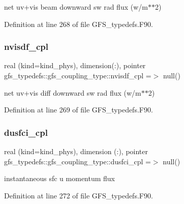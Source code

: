 net uv+vis beam downward sw rad flux (w/m$\ast$$\ast$2) 



Definition at line 268 of file G\+F\+S\+\_\+typedefs.\+F90.

\mbox{\label{structgfs__typedefs_1_1gfs__coupling__type_a486f2ffa99058e4e4cb3ec35f9bd5122}} 
\subsubsection{nvisdf\+\_\+cpl}
{\footnotesize\ttfamily real (kind=kind\+\_\+phys), dimension(\+:), pointer gfs\+\_\+typedefs\+::gfs\+\_\+coupling\+\_\+type\+::nvisdf\+\_\+cpl =$>$ null()}



net uv+vis diff downward sw rad flux (w/m$\ast$$\ast$2) 



Definition at line 269 of file G\+F\+S\+\_\+typedefs.\+F90.

\mbox{\label{structgfs__typedefs_1_1gfs__coupling__type_af62caaab262f6c0cd4082cf2f07096b1}} 
\subsubsection{dusfci\+\_\+cpl}
{\footnotesize\ttfamily real (kind=kind\+\_\+phys), dimension (\+:), pointer gfs\+\_\+typedefs\+::gfs\+\_\+coupling\+\_\+type\+::dusfci\+\_\+cpl =$>$ null()}



instantaneous sfc u momentum flux 



Definition at line 272 of file G\+F\+S\+\_\+typedefs.\+F90.

\mbox{\label{structgfs__typedefs_1_1gfs__coupling__type_a09a262df2d44e71d6fdc820e64cb13d4}} 
